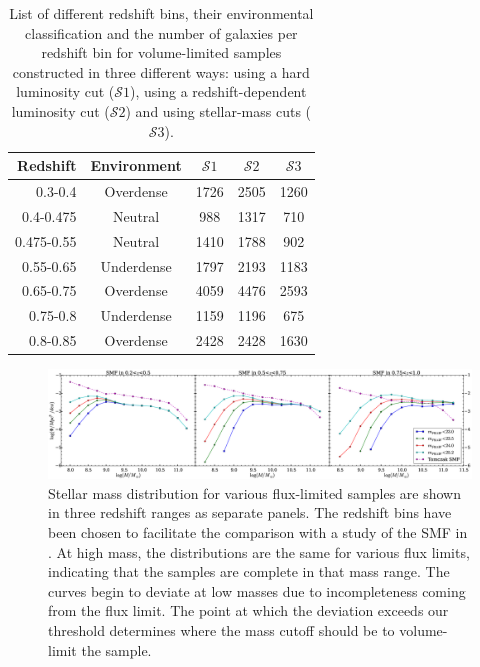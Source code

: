 \documentclass[twocolumn,useAMS,usenatbib]{mn2e}
\newcommand{\s}{\ensuremath{\mathcal{S}}}
\begin{document}
\begin{table} 
\centering
\begin{tabular}{|r|c|c|c|c|}
 \hline
 Redshift & Environment & \s$1$ & \s$2$ & \s$3$ \\
 \hline
 0.3-0.4 & Overdense & 1726 & 2505 & 1260 \\
 0.4-0.475 & Neutral & 988 & 1317 & 710 \\
 0.475-0.55 & Neutral & 1410 & 1788 & 902 \\
 0.55-0.65 & Underdense & 1797 & 2193 & 1183 \\
 0.65-0.75 & Overdense & 4059 & 4476 & 2593 \\
 0.75-0.8 & Underdense & 1159 & 1196 & 675 \\
 0.8-0.85 & Overdense & 2428 & 2428 & 1630 \\
 \hline
\end{tabular}
\caption{List of different redshift bins, their environmental
  classification and the number of galaxies per redshift bin for
  volume-limited samples constructed in three different ways: using a
  hard luminosity cut (\s$1$), using a redshift-dependent luminosity cut (\s$2$) and using stellar-mass cuts (\s$3$).}
\label{table:GalaxyCounts}
\end{table}

\begin{figure}
 \centering
 \includegraphics[width=2.2\columnwidth]{SMF}
 \caption{Stellar mass distribution for various flux-limited samples
   are shown in three redshift ranges as separate panels. The redshift
   bins have been chosen to facilitate the comparison with  
          a study of the SMF in \protect\cite{Tomczak_SMF}. At high mass, the
          distributions are the same for various flux limits,
          indicating that the samples are complete in that mass
          range. The curves begin to deviate at low masses due to
          incompleteness coming from the flux limit.  The point at
          which the deviation exceeds our threshold determines where the mass cutoff should be to volume-limit the sample.}
 \label{fig:smf}
\end{figure}
\end{document}
